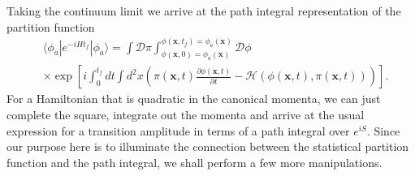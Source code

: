         Taking the continuum limit we arrive at the path integral representation of the partition function
        \begin{align}
            &\langle \phi_a | e^{-i H t_f} | \phi_a \rangle = \int \mathcal{D} \pi \int_{\phi(\bm{x},0) =\phi_a(\bm{x})}^{\phi(\bm{x}, t_f) = \phi_a(\bm{x})} \mathcal{D} \phi \nonumber \\
            &\times \exp \left[i \int_0^{t_f} dt \int d^2 x \left( \pi(\bm{x} ,t) \frac{\partial\phi(\bm{x}, t)}{ \partial t} - \mathcal{H}\left(\phi(\bm{x},t), \pi(\bm{x},t)\right) \right) \right] \label{eq:path_integral_amplitude}.
        \end{align}
        For a Hamiltonian that is quadratic in the canonical momenta, we can just complete the square, integrate out the momenta and arrive at the usual expression for a transition amplitude in terms of a path integral over $e^{i S}$. Since our purpose here is to illuminate the connection between the statistical partition function and the path integral, we shall perform a few more manipulations. 

